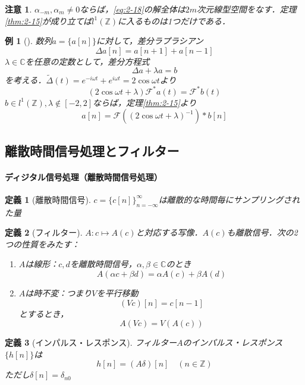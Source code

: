 \documentclass[dvipdfmx,a4j,10pt]{jsarticle}
\theoremstyle{mystyle1}
\theoremstyle{mystyle3}
\newtheorem{example}{例}[section]
\theoremstyle{mystyle4}
\newtheorem{note}{注意}[section]
\theoremstyle{mystyle6}
\theoremstyle{mystyle2}
\newtheorem{dfn*}{定義}
\theoremstyle{mystyle5}
\newenvironment{ex}[1][]
{\begin{tcolorbox}[
    enhanced,
    boxrule=0pt,
    arc=0mm,
    frame hidden,
    borderline west={0.25pt}{-4pt}{black},
    borderline west={0.25pt}{-2.25pt}{black},
    breakable = true
    ]
    \begin{example}[#1]
}
{\end{example}\end{tcolorbox}}
\begin{document}
\begin{note}
	$\alpha_{-m},\alpha_m\neq 0$ならば，\eqref{eq:2-18}の解全体は$2m$次元線型空間をなす．定理\ref{thm:2-15}が成り立てば$l^1(\mathbb{Z})$に入るものは1つだけである．
\end{note}

\begin{ex}
	数列$a=\{a[n]\}$に対して，差分ラプラシアン
	\[
		\Delta a[n]=a[n+1]+a[n-1]
	\]
	$\lambda\in\mathbb{C}$を任意の定数として，差分方程式
	\[
		\Delta a+\lambda a=b
	\]
	を考える．$\tilde \Delta (t)=e^{-i\omega t}+e^{i\omega t}=2\cos\omega t$より
	\[
		(2\cos\omega t+\lambda)  \mathcal{F}^*a(t)=\mathcal{F}^*b(t)
	\]
	$b\in l^1(\mathbb{Z}),\lambda\notin[-2,2]$ならば，定理\ref{thm:2-15}より
	\[
		a[n]=\mathcal{F}((2\cos\omega t+\lambda)^{-1})*b[n]
	\]
\end{ex}

\subsection{離散時間信号処理とフィルター}

\paragraph{ディジタル信号処理（離散時間信号処理）}

\begin{dfn*}[離散時間信号]
	$c=\{c[n]\}_{n=-\infty}^\infty$は離散的な時間毎にサンプリングされた量
\end{dfn*}

\begin{dfn*}[フィルター]
	$A:c\mapsto A(c)$と対応する写像．$A(c)$も離散信号．次の2つの性質をみたす：
	\begin{enumerate}
		\item $A$は線形：$c,d$を離散時間信号，$\alpha,\beta\in\mathbb{C}$のとき
		      \[
			      A(\alpha c+\beta d)=\alpha A(c)+\beta A(d)
		      \]
		\item $A$は時不変：つまり$V$を平行移動
		      \[
			      (Vc)[n]=c[n-1]
		      \]
		      とするとき，
		      \[
			      A(Vc)=V(A(c))
		      \]
	\end{enumerate}
\end{dfn*}

\begin{dfn*}[インパルス・レスポンス]
	フィルター$A$のインパルス・レスポンス$\{h[n]\}$は
	\[
		h[n]=(A\delta)[n]\quad(n\in\mathbb{Z})
	\]
	ただし$\delta[n]=\delta_{n0}$
\end{dfn*}
\end{document}
